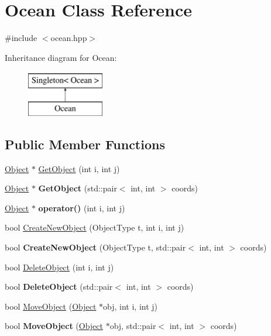 \hypertarget{classOcean}{
\section{Ocean Class Reference}
\label{classOcean}
}


{\ttfamily \#include $<$ocean.hpp$>$}

Inheritance diagram for Ocean:\begin{figure}[H]
\begin{center}
\leavevmode
\includegraphics[height=2cm]{classOcean}
\end{center}
\end{figure}
\subsection*{Public Member Functions}
\begin{DoxyCompactItemize}
\item 
\hyperlink{classObject}{Object} $\ast$ \hyperlink{classOcean_abe1c2639f431f057509ba765682fb8cc}{GetObject} (int i, int j)
\item 
\hypertarget{classOcean_a814b481b91d9713058d481218ffb1354}{
\hyperlink{classObject}{Object} $\ast$ {\bfseries GetObject} (std::pair$<$ int, int $>$ coords)}
\label{classOcean_a814b481b91d9713058d481218ffb1354}

\item 
\hypertarget{classOcean_adfd57c71b3f5b1641cbc2c75765f9e38}{
\hyperlink{classObject}{Object} $\ast$ {\bfseries operator()} (int i, int j)}
\label{classOcean_adfd57c71b3f5b1641cbc2c75765f9e38}

\item 
bool \hyperlink{classOcean_a66c18f1745faa96683ba9d42bcdec9bb}{CreateNewObject} (ObjectType t, int i, int j)
\item 
\hypertarget{classOcean_a2926e26c57d9f650c89298eadf63ccc6}{
bool {\bfseries CreateNewObject} (ObjectType t, std::pair$<$ int, int $>$ coords)}
\label{classOcean_a2926e26c57d9f650c89298eadf63ccc6}

\item 
bool \hyperlink{classOcean_a15165a09cbd8a6075d622902f562bc15}{DeleteObject} (int i, int j)
\item 
\hypertarget{classOcean_a0fbddaf476741ba579cdfbe4dde0a930}{
bool {\bfseries DeleteObject} (std::pair$<$ int, int $>$ coords)}
\label{classOcean_a0fbddaf476741ba579cdfbe4dde0a930}

\item 
bool \hyperlink{classOcean_a7b9cb70ece3c3275003ea49bdba2c2e2}{MoveObject} (\hyperlink{classObject}{Object} $\ast$obj, int i, int j)
\item 
\hypertarget{classOcean_adeab83a1c9b5baf97e963f65847b277b}{
bool {\bfseries MoveObject} (\hyperlink{classObject}{Object} $\ast$obj, std::pair$<$ int, int $>$ coords)}
\label{classOcean_adeab83a1c9b5baf97e963f65847b277b}

\end{DoxyCompactItemize}
